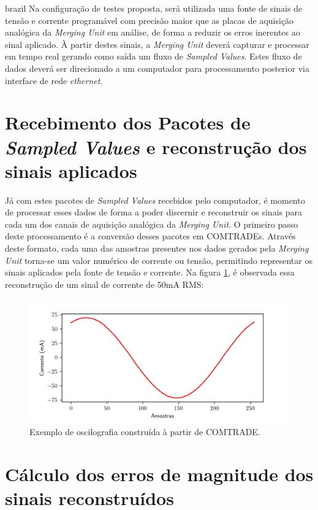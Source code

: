 \begin{otherlanguage*}{brazil}
Na configuração de testes proposta, será utilizada uma fonte de sinais de tensão e corrente programável com precisão maior que as placas de aquisição analógica da \textit{Merging Unit} em análise, de forma a reduzir os erros inerentes ao  sinal aplicado. À partir destes sinais, a \textit{Merging Unit} deverá capturar e processar em tempo real gerando como saída um fluxo de \textit{Sampled Values}. Estes fluxo de dados deverá ser direcionado a um computador para processamento posterior via interface de rede \textit{ethernet}.

\section{Recebimento dos Pacotes de \textit{Sampled Values} e reconstrução dos sinais aplicados}

Já com estes pacotes de \textit{Sampled Values} recebidos pelo computador, é momento de processar esses dados de forma a poder discernir e reconstruir os sinais para cada um dos canais de aquisição analógica da \textit{Merging Unit}. O primeiro passo deste processamento é a conversão desses pacotes em COMTRADEs. Através deste formato, cada uma das amostras presentes nos dados gerados pela \textit{Merging Unit} torna-se um valor numérico de corrente ou tensão, permitindo representar os sinais aplicados pela fonte de tensão e corrente. Na figura \ref{fig:sig_corr_reconst}, é observada essa reconstrução de um sinal de corrente de 50mA RMS:

\begin{figure}[H]
    \centering
    \includegraphics[width=14cm]{pictures/sig_corr_reconst.png}
    \caption{Exemplo de oscilografia construída à partir de COMTRADE.}
    \label{fig:sig_corr_reconst}
\end{figure}

\section{Cálculo dos erros de magnitude dos sinais reconstruídos}


\end{otherlanguage*}
